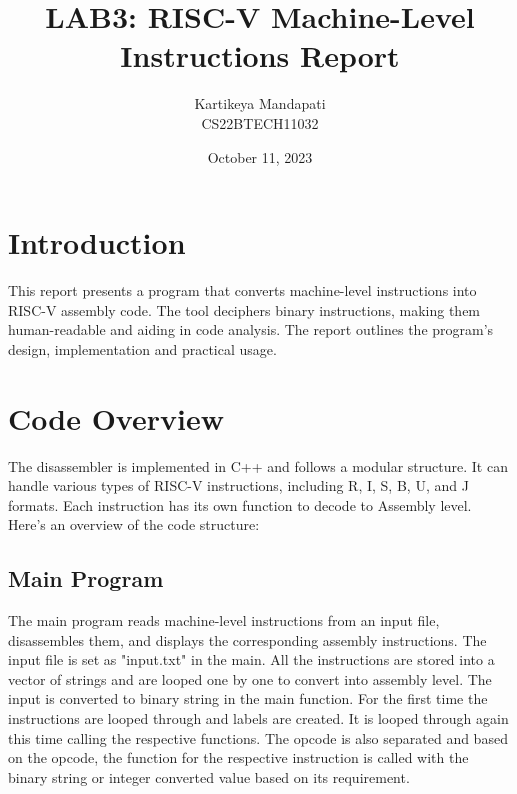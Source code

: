 \documentclass{article}
\title{\textbf{LAB3: RISC-V Machine-Level Instructions Report}}
\author{Kartikeya Mandapati \\CS22BTECH11032}
\date{October 11, 2023}
\begin{document}
\maketitle


\section{Introduction}
This report presents a program that converts machine-level instructions into RISC-V assembly code. The tool deciphers binary instructions, making them human-readable and aiding in code analysis. The report outlines the program's design, implementation and practical usage.
\section{Code Overview}
The disassembler is implemented in C++ and follows a modular structure. It can handle various types of RISC-V instructions, including R, I, S, B, U, and J formats. Each instruction has its own function to decode to Assembly level. Here's an overview of the code structure:

\subsection{Main Program}
The main program reads machine-level instructions from an input file, disassembles them, and displays the corresponding assembly instructions. The input file is set as "input.txt" in the main. All the instructions are stored into a vector of strings and are looped one by one to convert into assembly level.
The input is converted to binary string in the main function. For the first time the instructions are looped through and labels are created. It is looped through again this time calling the respective functions. The opcode is also separated and based on the opcode, the function for the respective instruction is called with the binary string or integer converted value based on its requirement.
\end{document}
